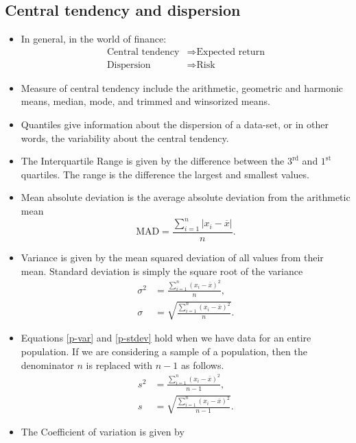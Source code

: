 \documentclass[../notes_compiled.tex]{subfiles}
\begin{document}
\subsection{Central tendency and dispersion}
\label{ssec-dispersion}
\begin{itemize}
\item In general, in the world of finance:
\begin{align*}
\text{Central tendency} &\Rightarrow \text{Expected return} \\
\text{Dispersion} &\Rightarrow \text{Risk}
\end{align*}
\item Measure of central tendency include the arithmetic, geometric and harmonic means, median, mode, and trimmed and winsorized means.
\item Quantiles give information about the dispersion of a data-set, or in other words, the variability about the central tendency.
\item The Interquartile Range is given by the difference between the $3^{\text{rd}}$ and $1^{\text{st}}$ quartiles. The range is the difference the largest and smallest values.
\item Mean absolute deviation is the average absolute deviation from the arithmetic mean
\begin{equation}
\text{MAD} = \frac{\sum_{i=1}^{n}\left|x_{i}-\overline{x}\right|}{n}.
\end{equation}
\item Variance is given by the mean squared deviation of all values from their mean. Standard deviation is simply the square root of the variance
\begin{align}
\sigma^{2} &= \frac{\sum_{i=1}^{n}\left(x_{i}-\overline{x}\right)^{2}}{n}, \label{p-var} \\
\sigma &= \sqrt{\frac{\sum_{i=1}^{n}\left(x_{i}-\overline{x}\right)^{2}}{n}}. \label{p-stdev}
\end{align}
\item Equations \ref{p-var} and \ref{p-stdev} hold when we have data for an entire population. If we are considering a sample of a population, then the denominator $n$ is replaced with $n-1$ as follows.
\begin{align}
s^{2} &= \frac{\sum_{i=1}^{n}\left(x_{i}-\overline{x}\right)^{2}}{n-1}, \label{s-var} \\
s &= \sqrt{\frac{\sum_{i=1}^{n}\left(x_{i}-\overline{x}\right)^{2}}{n-1}}. \label{s-stdev}
\end{align}
\item The Coefficient of variation is given by

\end{itemize}
\end{document}
